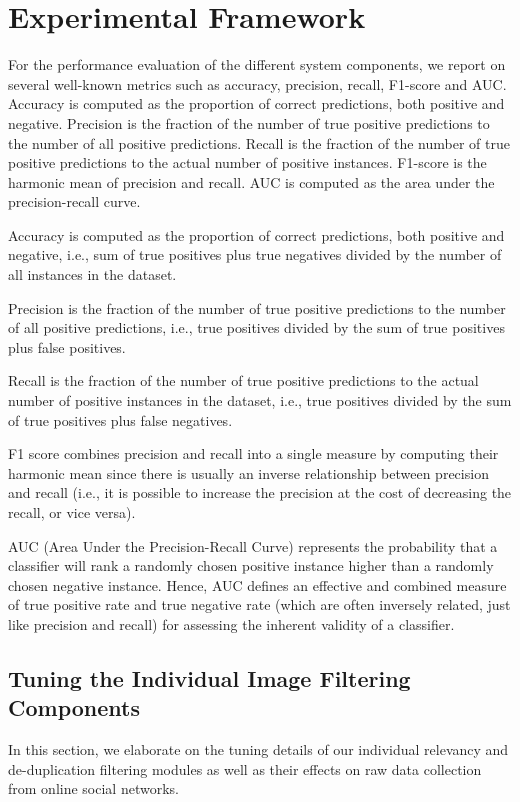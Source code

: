 \documentclass{iscram}
\begin{document}
\section{Experimental Framework}

For the performance evaluation of the different system components, we report on several well-known metrics such as accuracy, precision, recall, F1-score and AUC. Accuracy is computed as the proportion of correct predictions, both positive and negative. Precision is the fraction of the number of true positive predictions to the number of all positive predictions. Recall is the fraction of the number of true positive predictions to the actual number of positive instances. F1-score is the harmonic mean of precision and recall. AUC is computed as the area under the precision-recall curve.

Accuracy is computed as the proportion of correct predictions, both positive and negative, i.e., sum of true positives plus true negatives divided by the number of all instances in the dataset.

Precision is the fraction of the number of true positive predictions to the number of all positive predictions, i.e., true positives divided by the sum of true positives plus false positives.

Recall is the fraction of the number of true positive predictions to the actual number of positive instances in the dataset, i.e., true positives divided by the sum of true positives plus false negatives.

F1 score combines precision and recall into a single measure by computing their harmonic mean since there is usually an inverse relationship between precision and recall (i.e., it is possible to increase the precision at the cost of decreasing the recall, or vice versa).

AUC (Area Under the Precision-Recall Curve) represents the probability that a classifier will rank a randomly chosen positive instance higher than a randomly chosen negative instance. Hence, AUC defines an effective and combined measure of true positive rate and true negative rate (which are often inversely related, just like precision and recall) for assessing the inherent validity of a classifier.
\fi\subsection{Tuning the Individual Image Filtering Components}

In this section, we elaborate on the tuning details of our individual relevancy and de-duplication filtering modules as well as their effects on raw data collection from online social networks.
\end{document}
